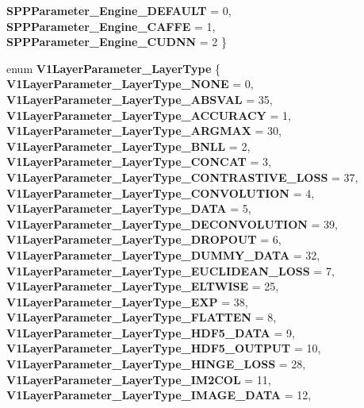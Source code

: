 \begin{DoxyCompactItemize}
{\bfseries S\+P\+P\+Parameter\+\_\+\+Engine\+\_\+\+D\+E\+F\+A\+U\+LT} = 0, 
\newline
{\bfseries S\+P\+P\+Parameter\+\_\+\+Engine\+\_\+\+C\+A\+F\+FE} = 1, 
{\bfseries S\+P\+P\+Parameter\+\_\+\+Engine\+\_\+\+C\+U\+D\+NN} = 2
 \}
\item 
\mbox{\label{namespacecaffe_ad73c014a600e7cc59405ca9c5e0681d4}} 
enum {\bfseries V1\+Layer\+Parameter\+\_\+\+Layer\+Type} \{ \newline
{\bfseries V1\+Layer\+Parameter\+\_\+\+Layer\+Type\+\_\+\+N\+O\+NE} = 0, 
{\bfseries V1\+Layer\+Parameter\+\_\+\+Layer\+Type\+\_\+\+A\+B\+S\+V\+AL} = 35, 
{\bfseries V1\+Layer\+Parameter\+\_\+\+Layer\+Type\+\_\+\+A\+C\+C\+U\+R\+A\+CY} = 1, 
{\bfseries V1\+Layer\+Parameter\+\_\+\+Layer\+Type\+\_\+\+A\+R\+G\+M\+AX} = 30, 
\newline
{\bfseries V1\+Layer\+Parameter\+\_\+\+Layer\+Type\+\_\+\+B\+N\+LL} = 2, 
{\bfseries V1\+Layer\+Parameter\+\_\+\+Layer\+Type\+\_\+\+C\+O\+N\+C\+AT} = 3, 
{\bfseries V1\+Layer\+Parameter\+\_\+\+Layer\+Type\+\_\+\+C\+O\+N\+T\+R\+A\+S\+T\+I\+V\+E\+\_\+\+L\+O\+SS} = 37, 
{\bfseries V1\+Layer\+Parameter\+\_\+\+Layer\+Type\+\_\+\+C\+O\+N\+V\+O\+L\+U\+T\+I\+ON} = 4, 
\newline
{\bfseries V1\+Layer\+Parameter\+\_\+\+Layer\+Type\+\_\+\+D\+A\+TA} = 5, 
{\bfseries V1\+Layer\+Parameter\+\_\+\+Layer\+Type\+\_\+\+D\+E\+C\+O\+N\+V\+O\+L\+U\+T\+I\+ON} = 39, 
{\bfseries V1\+Layer\+Parameter\+\_\+\+Layer\+Type\+\_\+\+D\+R\+O\+P\+O\+UT} = 6, 
{\bfseries V1\+Layer\+Parameter\+\_\+\+Layer\+Type\+\_\+\+D\+U\+M\+M\+Y\+\_\+\+D\+A\+TA} = 32, 
\newline
{\bfseries V1\+Layer\+Parameter\+\_\+\+Layer\+Type\+\_\+\+E\+U\+C\+L\+I\+D\+E\+A\+N\+\_\+\+L\+O\+SS} = 7, 
{\bfseries V1\+Layer\+Parameter\+\_\+\+Layer\+Type\+\_\+\+E\+L\+T\+W\+I\+SE} = 25, 
{\bfseries V1\+Layer\+Parameter\+\_\+\+Layer\+Type\+\_\+\+E\+XP} = 38, 
{\bfseries V1\+Layer\+Parameter\+\_\+\+Layer\+Type\+\_\+\+F\+L\+A\+T\+T\+EN} = 8, 
\newline
{\bfseries V1\+Layer\+Parameter\+\_\+\+Layer\+Type\+\_\+\+H\+D\+F5\+\_\+\+D\+A\+TA} = 9, 
{\bfseries V1\+Layer\+Parameter\+\_\+\+Layer\+Type\+\_\+\+H\+D\+F5\+\_\+\+O\+U\+T\+P\+UT} = 10, 
{\bfseries V1\+Layer\+Parameter\+\_\+\+Layer\+Type\+\_\+\+H\+I\+N\+G\+E\+\_\+\+L\+O\+SS} = 28, 
{\bfseries V1\+Layer\+Parameter\+\_\+\+Layer\+Type\+\_\+\+I\+M2\+C\+OL} = 11, 
\newline
{\bfseries V1\+Layer\+Parameter\+\_\+\+Layer\+Type\+\_\+\+I\+M\+A\+G\+E\+\_\+\+D\+A\+TA} = 12, 

\end{DoxyCompactItemize}
